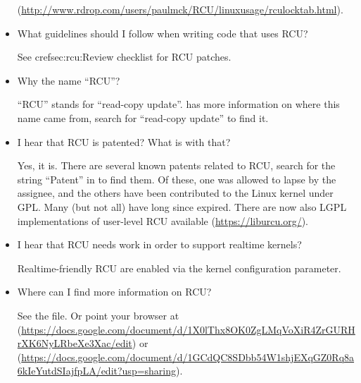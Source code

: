 \begin{itemize}
  (\url{http://www.rdrop.com/users/paulmck/RCU/linuxusage/rculocktab.html}).

\item What guidelines should I follow when writing code that uses RCU\@?

  See cref{sec:rcu:Review checklist for RCU patches}.

\item Why the name ``RCU\@''?

  ``RCU'' stands for ``read-copy update''.
   has more information on where this name came from, search
  for ``read-copy update'' to find it.

\item I hear that RCU is patented?
  What is with that?

  Yes, it is.
  There are several known patents related to RCU,
  search for the string ``Patent'' in  to find them.
  Of these, one was allowed to lapse by the assignee, and the
  others have been contributed to the Linux kernel under GPL\@.
  Many (but not all) have long since expired.
  There are now also LGPL implementations of user-level RCU
  available (\url{https://liburcu.org/}).

\item I hear that RCU needs work in order to support realtime kernels?

  Realtime-friendly RCU are enabled via the 
  kernel configuration parameter.

\item Where can I find more information on RCU\@?

  See the  file.
  Or point your browser at (\url{https://docs.google.com/document/d/1X0lThx8OK0ZgLMqVoXiR4ZrGURHrXK6NyLRbeXe3Xac/edit})
  or (\url{https://docs.google.com/document/d/1GCdQC8SDbb54W1shjEXqGZ0Rq8a6kIeYutdSIajfpLA/edit?usp=sharing}).
\end{itemize}
